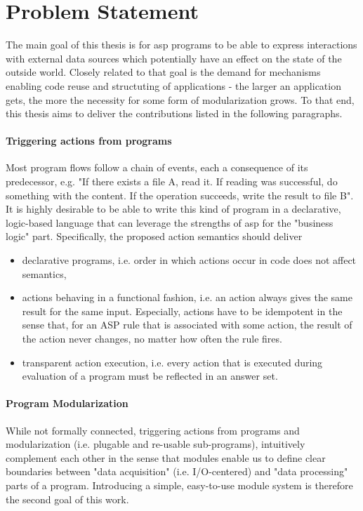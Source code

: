\section{Problem Statement}
\label{sec:problem-statement}

The main goal of this thesis is for \gls{asp} programs to be able to express interactions with external data sources which potentially have an effect on the state of the outside world. Closely related to that goal is the demand for mechanisms enabling code reuse and structuting of applications - the larger an application gets, the more the necessity for some form of modularization grows. To that end, this thesis aims to deliver the contributions listed in the following paragraphs.

\paragraph{Triggering actions from programs} \label{goals:actions}Most program flows follow a chain of events, each a consequence of its predecessor, e.g. "If there exists a file A, read it. If reading was successful, do something with the content. If the operation succeeds, write the result to file B". It is highly desirable to be able to write this kind of program in a declarative, logic-based language that can leverage the strengths of \gls{asp} for the "business logic" part. Specifically, the proposed action semantics should deliver
\begin{itemize}
    \item declarative programs, i.e. order in which actions occur in code does not affect semantics,
    \item actions behaving in a functional fashion, i.e. an action always gives the same result for the same input. Especially, actions have to be idempotent in the sense that, for an ASP rule that is associated with some action, the result of the action never changes, no matter how often the rule fires.
    \item transparent action execution, i.e. every action that is executed during evaluation of a program must be reflected in an answer set.
\end{itemize}

\paragraph{Program Modularization} While not formally connected, triggering actions from programs and modularization (i.e. plugable and re-usable sub-programs), intuitively complement each other in the sense that modules enable us to define clear boundaries between "data acquisition" (i.e. I/O-centered) and "data processing" parts of a program. Introducing a simple, easy-to-use module system is therefore the second goal of this work.

